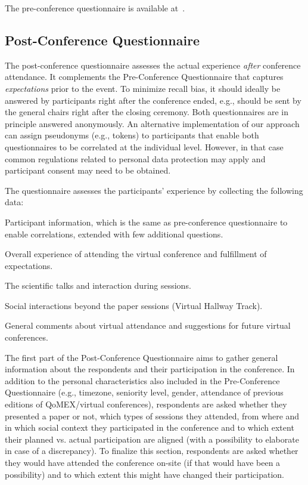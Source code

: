\documentclass[sigconf]{acmart}
\newcommand{\afblock}[1]{\noindent{\textbf{#1 }}}
\begin{document}
The pre-conference questionnaire is available at~\cite{VirtualConferencesGithub}.

\subsection{Post-Conference Questionnaire}
The post-conference questionnaire assesses the actual experience \emph{after} conference attendance.
It complements the Pre-Conference Questionnaire that captures \emph{expectations} prior to the event. 
To minimize recall bias, it should ideally be answered by participants right after the conference ended, e.g., should be sent by the general chairs right after the closing ceremony.
Both questionnaires are in principle answered anonymously.
An alternative implementation of our approach can assign pseudonyms (e.g., tokens) to participants that enable both questionnaires to be correlated at the individual level.
However, in that case common regulations related to personal data protection may apply and participant consent may need to be obtained.

The questionnaire assesses the participants' experience by collecting the following data:
\begin{inparaenum}[\it i)]
    \item Participant information, which is the same as pre-conference questionnaire to enable correlations, extended with few additional questions.
    \item Overall experience of attending the virtual conference and fulfillment of expectations.
    \item The scientific talks and interaction during sessions.
    \item Social interactions beyond the paper sessions (Virtual Hallway Track).
    \item General comments about virtual attendance and suggestions for future virtual conferences.
\end{inparaenum}

\afblock{Demographic Information.}
The first part of the Post-Conference Questionnaire aims to gather general information about the respondents and their participation in the conference.
In addition to the personal characteristics also included in the Pre-Conference Questionnaire (e.g., timezone, seniority level, gender, attendance of previous editions of QoMEX/virtual conferences), respondents are asked whether they presented a paper or not, which types of sessions they attended, from where and in which social context they participated in the conference and to which extent their planned vs. actual participation are aligned (with a possibility to elaborate in case of a discrepancy).
To finalize this section, respondents are asked whether they would have attended the conference on-site (if that would have been a possibility) and to which extent this might have changed their participation.
\end{document}
